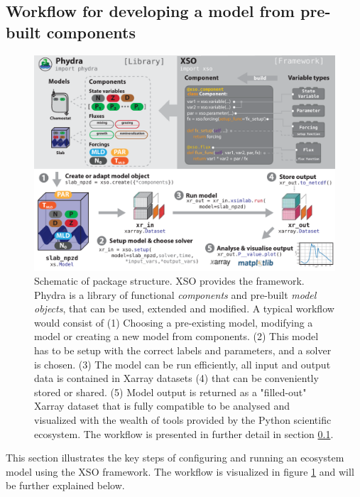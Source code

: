 \documentclass[journal abbreviation, manuscript]{copernicus}
\begin{document}
\subsection{Workflow for developing a model from pre-built components} \label{Section:ModelDevelopmentWorkflow}
%
\begin{figure}[t]
\includegraphics[width=12cm]{Figures/firstdraft_schematics/00_schematics_Package.pdf}
\caption{Schematic of package structure. XSO provides the framework. Phydra is a library of functional \textit{components} and pre-built \textit{model objects}, that can be used, extended and modified. A typical workflow would consist of (1) Choosing a pre-existing model, modifying a model or creating a new model from components. (2) This model has to be setup with the correct labels and parameters, and a solver is chosen. (3) The model can be run efficiently, all input and output data is contained in Xarray datasets (4) that can be conveniently stored or shared. (5) Model output is returned as a "filled-out" Xarray dataset that is fully compatible to be analysed and visualized with the wealth of tools provided by the Python scientific ecosystem. The workflow is presented in further detail in section \ref{Section:ModelDevelopmentWorkflow}.}
\label{Figure:PhydraXSOPackageSchematics}
\end{figure}

This section illustrates the key steps of configuring and running an ecosystem model using the XSO framework. The workflow is visualized in figure \ref{Figure:PhydraXSOPackageSchematics} and will be further explained below.
\end{document}
